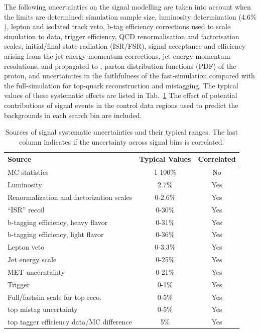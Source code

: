 The following uncertainties on the signal modelling are taken into account when the limits are determined: simulation sample size, luminosity determination ($4.6\%$), lepton and isolated track veto, b-tag efficiency corrections used to scale simulation to data, trigger efficiency, QCD renormalisation and factorisation scales, initial/final state radiation (ISR/FSR), signal acceptance and efficiency arising from the jet energy-momentum corrections, jet energy-momentum resolutions, and propagated to \MET, parton distribution functions (PDF) of the proton, and uncertainties in the faithfulness of the fast-simulation compared with the full-simulation for top-quark reconstruction and mistagging.  
%
The typical values of these systematic effects are listed in Tab.~\ref{tab:sigSyst}
%
The effect of potential contributions of signal events in the control data regions used to predict the backgrounds in each search bin are included. 
%
\begin{table}[hp]
\centering
\caption{Sources of signal systematic uncertainties and their typical ranges. The last column indicates if the uncertainty across signal bins is correlated.}
\label{tab:sigSyst}
\begin{tabular}{l|c|c}
\hline \hline
Source & Typical Values & Correlated \\
\hline
MC statistics & 1-100\% & No \\
\hline
Luminosity & 2.7\% &  Yes \\
\hline
Renormalization and factorization scales & 0-2.6\% & Yes \\
\hline
``ISR'' recoil & 0-30\% & Yes \\
\hline
b-tagging efficiency, heavy flavor & 0-31\% & Yes \\
\hline
b-tagging efficiency, light flavor & 0-36\% & Yes \\
\hline
Lepton veto & 0-3.3\% & Yes \\
\hline
Jet energy scale & 0-25\% & Yes \\
\hline
MET uncerntainty & 0-21\% & Yes \\
\hline
Trigger & 0-1\% & Yes \\
\hline
Full/fastsim scale for top reco. & 0-5\% & Yes \\
\hline
top mistag uncertainty & 0-5\% & Yes \\
\hline
top tagger efficiency data/MC difference & 5\% & Yes \\
\hline \hline
\end{tabular}
\end{table}

